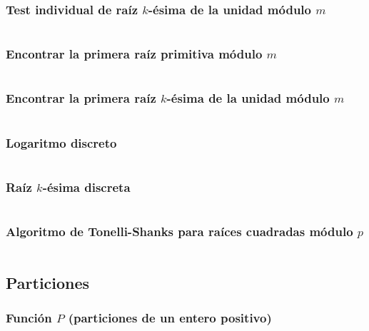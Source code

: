 \documentclass[11pt]{article}
\begin{document}
			\subsubsection{Test individual de raíz $k$-ésima de la unidad módulo $m$}
			\inputminted[tabsize=2,breaklines,firstline=327,lastline=336,fontsize=\small]{c++}{numberTheory.cpp}
			
			\subsubsection{Encontrar la primera raíz primitiva módulo $m$}
			\inputminted[tabsize=2,breaklines,firstline=338,lastline=355,fontsize=\small]{c++}{numberTheory.cpp}
			
			\subsubsection{Encontrar la primera raíz $k$-ésima de la unidad módulo $m$}
			\inputminted[tabsize=2,breaklines,firstline=357,lastline=373,fontsize=\small]{c++}{numberTheory.cpp}
			
			\subsubsection{Logaritmo discreto}
			\inputminted[tabsize=2,breaklines,firstline=375,lastline=398,fontsize=\small]{c++}{numberTheory.cpp}
			
			\subsubsection{Raíz $k$-ésima discreta}
			\inputminted[tabsize=2,breaklines,firstline=400,lastline=416,fontsize=\small]{c++}{numberTheory.cpp}
			
			\subsubsection{Algoritmo de Tonelli-Shanks para raíces cuadradas módulo $p$}
			\inputminted[tabsize=2,breaklines,firstline=908,lastline=937,fontsize=\small]{c++}{numberTheory.cpp}
			
		\subsection{Particiones}
			\subsubsection{Función $P$ (particiones de un entero positivo)}
			\inputminted[tabsize=2,breaklines,firstline=519,lastline=547,fontsize=\small]{c++}{numberTheory.cpp}
			
\end{document}
